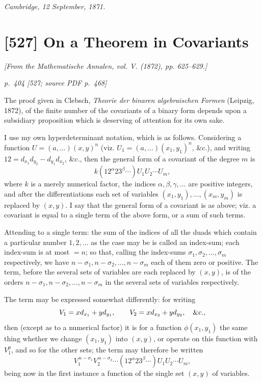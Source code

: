 \documentclass[11pt,a4paper]{article}
\newcommand{\pagemarker}[3]{\par\bigskip\noindent\textit{p.~#1 [#2; source PDF p.~#3]}\par\smallskip}
\begin{document}
\noindent\textit{Cambridge, 12 September, 1871.}

\clearpage
\section*{[527] On a Theorem in Covariants}
\begin{center}
\textit{[From the Mathematische Annalen, vol. V. (1872), pp. 625--629.]}
\end{center}

\pagemarker{404}{527}{468}

The proof given in Clebsch, \textit{Theorie der binaren algebraischen Formen} (Leipzig,
1872), of the finite number of the covariants of a binary form depends upon a
subsidiary proposition which is deserving of attention for its own sake.

I use my own hyperdeterminant notation, which is as follows. Considering a function
$U=(a,\ldots)(x,y)^n$ (viz. $U_1=(a,\ldots)(x_1,y_1)^n$, \&c.), and writing
$12=d_{x_1}d_{y_2}-d_{y_1}d_{x_2}$, \&c., then the general form of a covariant of the
degree $m$ is
\[
k(12^\alpha 23^\beta\cdots)U_1U_2\cdots U_m,
\]
where $k$ is a merely numerical factor, the indices $\alpha,\beta,\gamma,\ldots$ are
positive integers, and after the differentiations each set of variables
$(x_1,y_1),\ldots,(x_m,y_m)$ is replaced by $(x,y)$. I say that the general form of a
covariant is as above; viz. a covariant is equal to a single term of the above form, or
a sum of such terms.

Attending to a single term: the sum of the indices of all the duads which contain a
particular number $1,2,\ldots$ as the case may be is called an index-sum; each
index-sum is at most $=n$; so that, calling the index-sums
$\sigma_1,\sigma_2,\ldots,\sigma_m$ respectively, we have
$n-\sigma_1,n-\sigma_2,\ldots,n-\sigma_m$ each of them zero or positive. The term,
before the several sets of variables are each replaced by $(x,y)$, is of the orders
$n-\sigma_1,n-\sigma_2,\ldots,n-\sigma_m$ in the several sets of variables respectively.

The term may be expressed somewhat differently: for writing
\[
V_1=xd_{x_1}+yd_{y_1},\qquad V_2=xd_{x_2}+yd_{y_2},\quad\hbox{\&c.},
\]
then (except as to a numerical factor) it is for a function $\phi(x_1,y_1)$ the same
thing whether we change $(x_1,y_1)$ into $(x,y)$, or operate on this function with
$V_1^p$, and so for the other sets; the term may therefore be written
\[
V_1^{\,n-\sigma_1}V_2^{\,n-\sigma_2}\cdots
(12^\alpha 23^\beta\cdots)U_1U_2\cdots U_m,
\]
being now in the first instance a function of the single set $(x,y)$ of variables.
\end{document}
